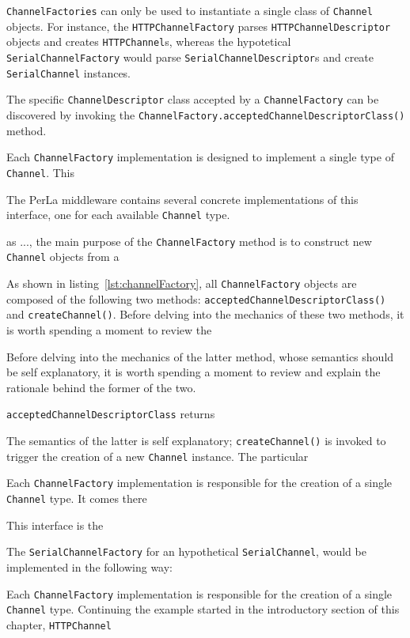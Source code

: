 \texttt{ChannelFactories} can only be used to instantiate a single class of \texttt{Channel} objects. For instance, the \texttt{HTTPChannelFactory} parses \texttt{HTTPChannelDescriptor} objects and creates \texttt{HTTPChannel}s, whereas the hypotetical \texttt{SerialChannelFactory} would parse \texttt{SerialChannelDescriptor}s and create \texttt{SerialChannel} instances.

The specific \texttt{ChannelDescriptor} class accepted by a \texttt{ChannelFactory} can be discovered by invoking the \texttt{ChannelFactory.acceptedChannelDescriptorClass()} method.






Each \texttt{ChannelFactory} implementation is designed to implement a single type of \texttt{Channel}. This 

The PerLa middleware contains several concrete implementations of this interface, one for each available \texttt{Channel} type. 

as ..., the main purpose of the \texttt{ChannelFactory} method is to construct new \texttt{Channel} objects from a 

As shown in listing~\ref{lst:channelFactory}, all \texttt{ChannelFactory} objects are composed of the following two methods: \texttt{acceptedChannelDescriptorClass()} and \texttt{createChannel()}. Before delving into the mechanics of these two methods, it is worth spending a moment to review the 


Before delving into the mechanics of the latter method, whose semantics should be self explanatory, it is worth spending a moment to review and explain the rationale behind the former of the two.

\texttt{acceptedChannelDescriptorClass} returns 



The semantics of the latter is self explanatory; \texttt{createChannel()} is invoked to trigger the creation of a new \texttt{Channel} instance. The particular 



Each \texttt{ChannelFactory} implementation is responsible for the creation of a single \texttt{Channel} type. It comes there 

This interface is the 

The \texttt{SerialChannelFactory} for an hypothetical \texttt{SerialChannel}, would be implemented in the following way:

Each \texttt{ChannelFactory} implementation is responsible for the creation of a single \texttt{Channel} type. Continuing the example started in the introductory section of this chapter, \texttt{HTTPChannel}

